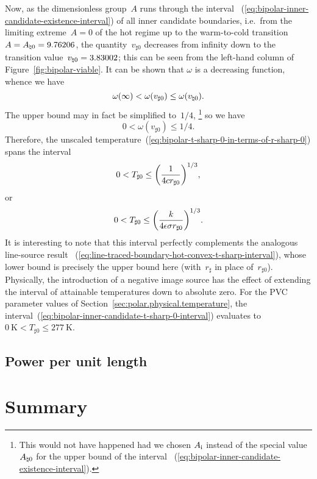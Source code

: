 Now, as the dimensionless group~$A$
runs through the interval~%
  (\ref{eq:bipolar-inner-candidate-existence-interval})
of all inner candidate boundaries,
i.e.~from the limiting extreme~$A = 0$ of the hot regime
up to the warm-to-cold transition~$A = A_{\natural 0} = 9.76206$,
the quantity~$v_{\sharp 0}$ decreases from infinity
down to the transition value~$v_{\natural 0} = 3.83002$;
this can be seen from the left-hand column
of Figure~\ref{fig:bipolar-viable}.
It can be shown that $\omega$ is a decreasing function,
whence we have
\begin{equation}
  \omega (\infty) < \omega (v_{\sharp 0}) \le \omega (v_{\natural 0}).
  \label{eq:bipolar-inner-candidate-omega-interval}
\end{equation}
The upper bound may in fact be simplified to~$1/4$,%
\footnote{
  This would not have happened
  had we chosen $A_{\mathrm{i}}$ instead of the special value~$A_{\natural 0}$
  for the upper bound of the interval~%
  (\ref{eq:bipolar-inner-candidate-existence-interval}).
}
so we have
\begin{equation}
  0 < \omega (v_{\sharp 0}) \le 1/4.
  \label{eq:bipolar-inner-candidate-omega-interval-evaluated}
\end{equation}
Therefore,
the unscaled temperature~(\ref{eq:bipolar-t-sharp-0-in-terms-of-r-sharp-0})
spans the interval
\[
  0
    <
  T_{\sharp 0}
    \le
  \roundbr*{\frac{1}{4 c r_{\sharp 0}}}^{1/3},
\]
or
\begin{equation}
  0
    <
  T_{\sharp 0}
    \le
  \roundbr*{\frac{\conduc}{4 \emiss \stefan r_{\sharp 0}}}^{1/3}.
  \label{eq:bipolar-inner-candidate-t-sharp-0-interval}
\end{equation}
It is interesting to note that this interval
perfectly complements the analogous line-source result~%
  (\ref{eq:line-traced-boundary-hot-convex-t-sharp-interval}),
whose lower bound is precisely the upper bound here
(with~$r_\sharp$ in place of~$r_{\sharp 0}$).
Physically, the introduction of a negative image source
has the effect of extending the interval of attainable temperatures
down to absolute zero.
For the PVC parameter values
of Section~\ref{sec:polar.physical.temperature},
the interval~(\ref{eq:bipolar-inner-candidate-t-sharp-0-interval})
evaluates to $\SI{0}{\kelvin} < T_{\sharp 0} \le \SI{277}{\kelvin}$.

\subsection{Power per unit length}
\label{sec:bipolar.physical.power}


\section{Summary}
\label{sec:bipolar.summary}

